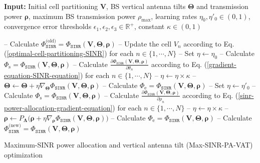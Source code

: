 \begin{algorithm}[ht!]
\SetAlgoLined
{}

\textbf{Input:} Initial cell partitioning $\bm{V}$, BS vertical antenna tilts $\mathbf{\Theta}$ and transmission power $\bm{\rho}$, 
maximum BS transmission power $\rho_{\max}$, learning rates $\eta_0, \eta'_0 \in (0,1)$, 
convergence error thresholds $\epsilon_1, \epsilon_2, \epsilon_3 \in \mathbb{R}^+$, constant $\kappa \in  (0, 1)$\;


{
-- Calculate  $\Phi_{\mathtt{SINR}}^{\textrm{(old)}} = \Phi_{\mathtt{SINR}}\left(\bm{V},\mathbf{\Theta}, \bm{\rho}\right)$\;
-- Update the cell $V_n$ according to Eq. (\ref{optimal-cell-partitioning-SINR}) for each $n \in \{1, \cdots, N\}$\;
-- Set $\eta \gets \eta_0$\;
{
-- Calculate  $\Phi_{\textrm{s}} = \Phi_{\mathtt{SINR}}\left(\bm{V},\mathbf{\Theta},\bm{\rho}\right)$\;
-- Calculate $\frac{\partial \Phi_{\mathtt{SINR}}(\mathbf{V},\mathbf{\Theta},\bm{\rho})}{\partial \theta_n}$ according to Eq. (\ref{gradient-equation-SINR-equation}) for each $n \in \{1, \cdots, N\}$\;
-- $\eta \gets \eta \times \kappa$\;
-- $\mathbf{\Theta} \gets \mathbf{\Theta} + \eta \nabla_{\mathbf{\Theta}} \Phi_{\mathtt{SINR}}(\bm{V},\mathbf{\Theta},\bm{\rho})$\;
-- Calculate $\Phi_{\textrm{e}} = \Phi_{\mathtt{SINR}}\left(\bm{V},\mathbf{\Theta}, \bm{\rho}\right)$\;
}
-- Set $\eta \gets \eta'_0$\;
{
-- Calculate  $\Phi_{\textrm{s}} = \Phi_{\mathtt{SINR}}\left(\bm{V},\mathbf{\Theta}, \bm{\rho}\right)$\;
-- Calculate $\frac{\partial \Phi_{\mathtt{SINR}}(\mathbf{V},\mathbf{\Theta}, \bm{\rho})}{\partial \rho_n}$ according to Eq. (\ref{sinr-power-allocation-gradient-equation}) for each $n \in \{1, \cdots, N\}$\;
-- $\eta \gets \eta \times \kappa$\;
-- $\bm{\rho} \gets P_{\bm{\Lambda}}\big(\bm{\rho} + \eta \nabla_{\bm{\rho}} \Phi_{\mathtt{SINR}}(\bm{V},\mathbf{\Theta}, \bm{\rho})\big)$\;
-- Calculate $\Phi_{\textrm{e}} = \Phi_{\mathtt{SINR}}\left(\bm{V},\mathbf{\Theta}, \bm{\rho}\right)$\;
}
-- Calculate  $\Phi_{\mathtt{SINR}}^{\textrm{(new)}} = \Phi_{\mathtt{SINR}}\left(\bm{V},\mathbf{\Theta}, \bm{\rho}\right)$\;
}
 \caption{Maximum-SINR power allocation and vertical antenna tilt (Max-SINR-PA-VAT) optimization}
 \label{BS_PA_VAT_Algorithm}
\end{algorithm}



